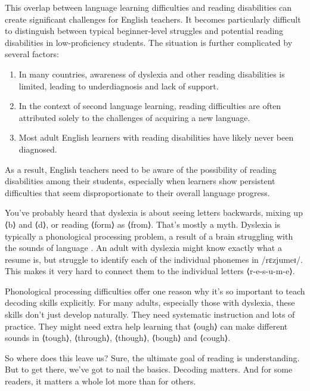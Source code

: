 This overlap between language learning difficulties and reading disabilities can create significant challenges for English teachers. It becomes particularly difficult to distinguish between typical beginner-level struggles and potential reading disabilities in low-proficiency students. The situation is further complicated by several factors:

\begin{enumerate}[noitemsep]
    \item In many countries, awareness of dyslexia and other reading disabilities is limited, leading to underdiagnosis and lack of support.

    \item In the context of second language learning, reading difficulties are often attributed solely to the challenges of acquiring a new language.
    
    \item Most adult English learners with reading disabilities have likely never been diagnosed.
\end{enumerate}

As a result, English teachers need to be aware of the possibility of reading disabilities among their students, especially when learners show persistent difficulties that seem disproportionate to their overall language progress.

\bigskip

You've probably heard that dyslexia is about seeing letters backwards, mixing up ⟨b⟩ and ⟨d⟩, or reading ⟨form⟩ as ⟨from⟩. That's mostly a myth. Dyslexia is typically a phonological processing problem, a result of a brain struggling with the sounds of language \citep{lyon2003definition}. An adult with dyslexia might know exactly what a resume is, but struggle to identify each of the individual phonemes in /rɛzjumeɪ/. This makes it very hard to connect them to the individual letters ⟨r-e-s-u-m-e⟩.

Phonological processing difficulties offer one reason why it's so important to teach decoding skills explicitly. For many adults, especially those with dyslexia, these skills don't just develop naturally. They need systematic instruction and lots of practice. They might need extra help learning that ⟨ough⟩ can make different sounds in ⟨tough⟩, ⟨through⟩, ⟨though⟩, ⟨bough⟩ and ⟨cough⟩.

So where does this leave us? Sure, the ultimate goal of reading is understanding. But to get there, we've got to nail the basics. Decoding matters. And for some readers, it matters a whole lot more than for others.

